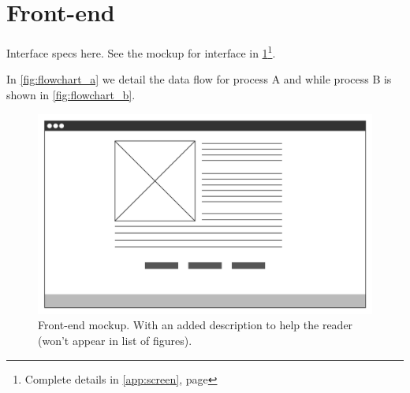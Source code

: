 

\section{Front-end}
\label{sec:dev_frt}

Interface specs here. See the mockup for interface in \cref{fig:mockup_front-end}\footnote{Complete details in \cref{app:screen}, page \pageref{app:screen}}.

In \cref{fig:flowchart_a} we detail the data flow for process A and while process B is shown in \cref{fig:flowchart_b}.

\begin{figure}[ht]
    \centering
    \includegraphics[width=.7\textwidth]{2_main_body/images/mockup.png}
    \caption[Front-end mockup]{Front-end mockup. With an added description to help the reader (won't appear in list of figures).}
    \label{fig:mockup_front-end}
\end{figure}

